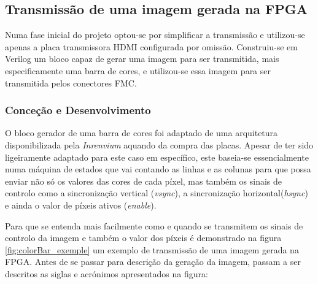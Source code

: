 \subsection{Transmissão de uma imagem gerada na FPGA} \label{subsub:planA}

Numa fase inicial do projeto optou-se por simplificar a transmissão e utilizou-se apenas a placa transmissora HDMI configurada por omissão. Construiu-se em Verilog um bloco capaz de gerar uma imagem para ser transmitida, mais especificamente uma barra de cores, e utilizou-se essa imagem para ser transmitida pelos conectores FMC.

\subsubsection*{Conceção e Desenvolvimento}

O bloco gerador de uma barra de cores foi adaptado de uma arquitetura disponibilizada pela \textit{Inrenvium} aquando da compra das placas. Apesar de ter sido ligeiramente adaptado para este caso em específico, este baseia-se essencialmente numa máquina de estados que vai contando as linhas e as colunas para que possa enviar não só os valores das cores de cada píxel, mas também os sinais de controlo como a sincronização vertical (\textit{vsync}), a sincronização horizontal(\textit{hsync}) e ainda o valor de píxeis ativos (\textit{enable}).

Para que se entenda mais facilmente como e quando se transmitem os sinais de controlo da imagem e também o valor dos píxeis é demonstrado na figura \ref{fig:colorBar_exemple} um exemplo de transmissão de uma imagem gerada na FPGA. Antes de se passar para descrição da geração da imagem, passam a ser descritos as siglas e acrónimos apresentados na figura:

